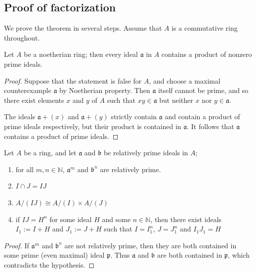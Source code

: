 \documentclass[12pt, oneside]{book}
\begin{document}
\subsection{Proof of factorization} %
We prove the theorem in several steps. Assume that $A$ is a commutative ring throughout.
\begin{lemma}
    \label{lem:1}
    Let $A$ be a noetherian ring; then every ideal $\mathfrak{a}$ in $A$ contains a product of nonzero prime ideals.
    \begin{proof}
        Suppose that the statement is false for $A$, and choose a maximal counterexample $\mathfrak{a}$ by Noetherian property.
        Then $\mathfrak{a}$ itself cannot be prime, and so there exist elements $x$ and $y$ of $A$ such that $x y \in \mathfrak{a}$ but neither $x$ nor $y \in \mathfrak{a}$.

        The ideals $\mathfrak{a}+(x)$ and $\mathfrak{a}+(y)$ strictly contain $\mathfrak{a}$ and contain a product of prime ideals respectively, but their product is contained in $\mathfrak{a}$.
        It follows that $\mathfrak{a}$ contains a product of prime ideals.
    \end{proof}
\end{lemma}

\begin{lemma}
    \label{lem:2}
    Let $A$ be a ring, and let $\mathfrak{a}$ and $\mathfrak{b}$ be relatively prime ideals in $A$;
    \begin{enumerate}
        \item
              for all $m, n \in \mathbb{N}$, $\mathfrak{a}^m$ and $\mathfrak{b}^n$ are relatively prime.
        \item $I\cap J=IJ$
        \item $A/(IJ)\cong A/(I)\times A/(J)$
        \item if $IJ=H^n$ for some ideal $H$ and some $n \in \mathbb{N}$, then there exist ideals $I_1:=I+H$ and $J_1:=J+H$ such that $I=I_1^n$, $J=J_1^n$ and $I_1J_1=H$
    \end{enumerate}
    \begin{proof}
        If $\mathfrak{a}^m$ and $\mathfrak{b}^n$ are not relatively prime, then they are both contained in some prime (even maximal) ideal $\mathfrak{p}$.
        Thus $\mathfrak{a}$ and $\mathfrak{b}$ are both contained in $\mathfrak{p}$, which contradicts the hypothesis.
    \end{proof}
\end{lemma}
\end{document}
